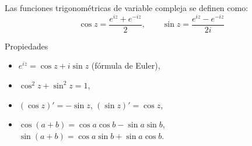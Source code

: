 \documentclass[spanish,presentation]{beamer}
\begin{document}
\begin{frame}[label=sec-2-1]{}
\begin{definition}
Las funciones trigonométricas de variable compleja se definen
como:
\begin{displaymath}
\cos z=\frac{e^{iz}+e^{-iz}}{2},\qquad \sin z=\frac{e^{iz}-e^{-iz}}{2i}
\end{displaymath}
\end{definition}

\begin{block}{Propiedades}
\begin{itemize}
\item \(e^{iz}=\cos z+i\sin z\) (fórmula de Euler),
\item \(\cos^{2} z+\sin^{2}z=1\),
\item \((\cos z)'=-\sin z\), \((\sin z)'=\cos z\),
\item \(\cos(a+b)=\cos a\cos b-\sin a\sin b\), \(\sin(a+b)=\cos a\sin
      b+\sin a\cos b\).
\end{itemize}
\end{block}
\end{frame}
\end{document}
